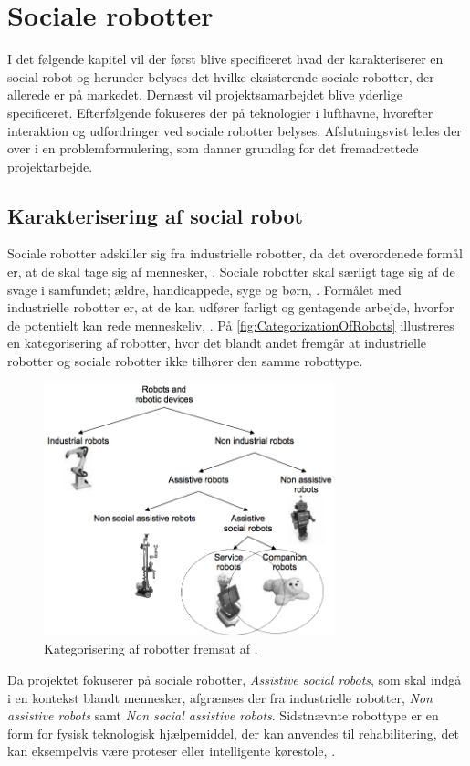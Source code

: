 \chapter{Sociale robotter}
\label{SocialRobot}
%
I det følgende kapitel vil der først blive specificeret hvad der karakteriserer en social robot og herunder belyses det hvilke eksisterende sociale robotter, der allerede er på markedet. Dernæst vil projektsamarbejdet blive yderlige specificeret. Efterfølgende fokuseres der på teknologier i lufthavne, hvorefter interaktion og udfordringer ved sociale robotter belyses. Afslutningsvist ledes der over i en problemformulering, som danner grundlag for det fremadrettede projektarbejde.
%
\section{Karakterisering af social robot}
\label{KarakteriseringAfSocialRobot}
%
Sociale robotter adskiller sig fra industrielle robotter, da det overordenede formål er, at de skal tage sig af mennesker, \parencite[s. 13]{PDF:RobotShiftFromIPtoSR}. Sociale robotter skal særligt tage sig af de svage i samfundet; ældre, handicappede, syge og børn, \parencite[s. 14]{PDF:RobotShiftFromIPtoSR}. Formålet med industrielle robotter er, at de kan udfører farligt og gentagende arbejde, hvorfor de potentielt kan rede menneskeliv, \parencite[ss. 12-13]{PDF:RobotShiftFromIPtoSR}. På \autoref{fig:CategorizationOfRobots} illustreres en kategorisering af robotter, hvor det blandt andet fremgår at industrielle robotter og sociale robotter ikke tilhører den samme robottype.    
%
\begin{figure}[H]
\centering
\includegraphics[width = 0.75\textwidth]{Figure/Introduktion/CategorizationOfRobots} 
\caption{Kategorisering af robotter fremsat af \textcite[s. 13]{PDF:AssesingAcceptance}.}
\label{fig:CategorizationOfRobots}
\end{figure}
\noindent 
%
Da projektet fokuserer på sociale robotter, \textit{Assistive social robots}, som skal indgå i en kontekst blandt mennesker, afgrænses der fra industrielle robotter, \textit{Non assistive robots} samt \textit{Non social assistive robots}. Sidstnævnte robottype er en form for fysisk teknologisk hjælpemiddel, der kan anvendes til rehabilitering, det kan eksempelvis være proteser eller intelligente kørestole, \parencite[s. 12]{PDF:AssesingAcceptance}.    

